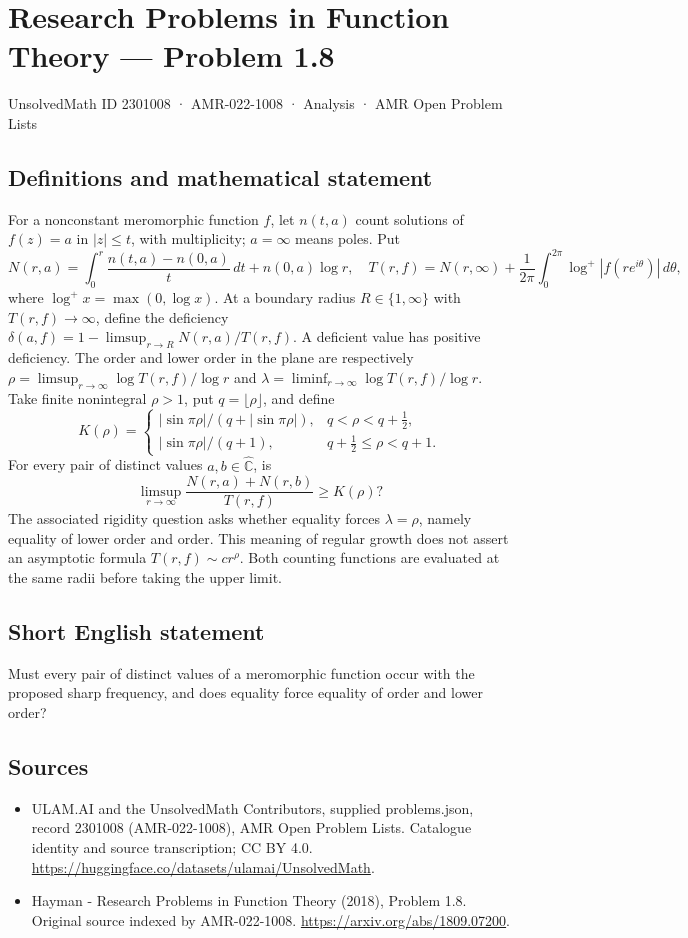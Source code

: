 \documentclass[11pt,a4paper]{article}
\begin{document}
\section*{Research Problems in Function Theory — Problem 1.8}\label{2301008}
{\small UnsolvedMath ID 2301008 · AMR-022-1008 · Analysis · AMR Open Problem Lists}
\subsection{Definitions and mathematical statement}
For a nonconstant meromorphic function $f$, let $n(t,a)$ count solutions of $f(z)=a$ in $|z|\le t$, with multiplicity; $a=\infty$ means poles. Put
\[
N(r,a)=\int_0^r\frac{n(t,a)-n(0,a)}t\,dt+n(0,a)\log r,
\quad T(r,f)=N(r,\infty)+\frac1{2\pi}\int_0^{2\pi}\log^+|f(re^{i\theta})|\,d\theta,
\]
where $\log^+x=\max(0,\log x)$. At a boundary radius $R\in\{1,\infty\}$ with $T(r,f)\to\infty$, define the deficiency
$\delta(a,f)=1-\limsup_{r\to R}N(r,a)/T(r,f)$. A deficient value has positive deficiency. The order and lower order in the plane are respectively
$\rho=\limsup_{r\to\infty}\log T(r,f)/\log r$ and
$\lambda=\liminf_{r\to\infty}\log T(r,f)/\log r$.
Take finite nonintegral $\rho>1$, put $q=\lfloor\rho\rfloor$, and define
\[
K(\rho)=\begin{cases}
|\sin\pi\rho|/(q+|\sin\pi\rho|),&q<\rho<q+\tfrac12,\\
|\sin\pi\rho|/(q+1),&q+\tfrac12\le\rho<q+1.
\end{cases}
\]
For every pair of distinct values $a,b\in\widehat{\mathbb C}$, is
\[
\limsup_{r\to\infty}\frac{N(r,a)+N(r,b)}{T(r,f)}\ge K(\rho)?
\]
The associated rigidity question asks whether equality forces $\lambda=\rho$, namely equality of lower order and order. This meaning of regular growth does not assert an asymptotic formula $T(r,f)\sim cr^\rho$. Both counting functions are evaluated at the same radii before taking the upper limit.
\subsection{Short English statement}
Must every pair of distinct values of a meromorphic function occur with the proposed sharp frequency, and does equality force equality of order and lower order?
\subsection{Sources}
\begin{itemize}
\item[S1] ULAM.AI and the UnsolvedMath Contributors, supplied problems.json, record 2301008 (AMR-022-1008), AMR Open Problem Lists. Catalogue identity and source transcription; CC BY 4.0.
\url{https://huggingface.co/datasets/ulamai/UnsolvedMath}.
\item[S2] Hayman - Research Problems in Function Theory (2018), Problem 1.8. Original source indexed by AMR-022-1008.
\url{https://arxiv.org/abs/1809.07200}.
\end{itemize}
\end{document}
